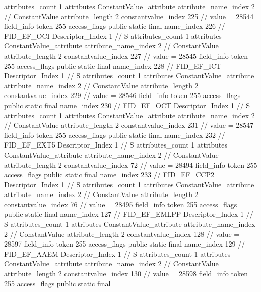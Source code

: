 {{{{{				attributes_count	1
				attributes {
				ConstantValue_attribute {
					attribute_name_index	2		// ConstantValue
					attribute_length	2
					constantvalue_index	225		// value = 28544
				}
				}
			}
			field_info {
				token	255
				access_flags	public static final
				name_index	226		// FID_EF_OCI
				Descriptor_Index	1		// S
				attributes_count	1
				attributes {
				ConstantValue_attribute {
					attribute_name_index	2		// ConstantValue
					attribute_length	2
					constantvalue_index	227		// value = 28545
				}
				}
			}
			field_info {
				token	255
				access_flags	public static final
				name_index	228		// FID_EF_ICT
				Descriptor_Index	1		// S
				attributes_count	1
				attributes {
				ConstantValue_attribute {
					attribute_name_index	2		// ConstantValue
					attribute_length	2
					constantvalue_index	229		// value = 28546
				}
				}
			}
			field_info {
				token	255
				access_flags	public static final
				name_index	230		// FID_EF_OCT
				Descriptor_Index	1		// S
				attributes_count	1
				attributes {
				ConstantValue_attribute {
					attribute_name_index	2		// ConstantValue
					attribute_length	2
					constantvalue_index	231		// value = 28547
				}
				}
			}
			field_info {
				token	255
				access_flags	public static final
				name_index	232		// FID_EF_EXT5
				Descriptor_Index	1		// S
				attributes_count	1
				attributes {
				ConstantValue_attribute {
					attribute_name_index	2		// ConstantValue
					attribute_length	2
					constantvalue_index	72		// value = 28494
				}
				}
			}
			field_info {
				token	255
				access_flags	public static final
				name_index	233		// FID_EF_CCP2
				Descriptor_Index	1		// S
				attributes_count	1
				attributes {
				ConstantValue_attribute {
					attribute_name_index	2		// ConstantValue
					attribute_length	2
					constantvalue_index	76		// value = 28495
				}
				}
			}
			field_info {
				token	255
				access_flags	public static final
				name_index	127		// FID_EF_EMLPP
				Descriptor_Index	1		// S
				attributes_count	1
				attributes {
				ConstantValue_attribute {
					attribute_name_index	2		// ConstantValue
					attribute_length	2
					constantvalue_index	128		// value = 28597
				}
				}
			}
			field_info {
				token	255
				access_flags	public static final
				name_index	129		// FID_EF_AAEM
				Descriptor_Index	1		// S
				attributes_count	1
				attributes {
				ConstantValue_attribute {
					attribute_name_index	2		// ConstantValue
					attribute_length	2
					constantvalue_index	130		// value = 28598
				}
				}
			}
			field_info {
				token	255
				access_flags	public static final
}}}}}
